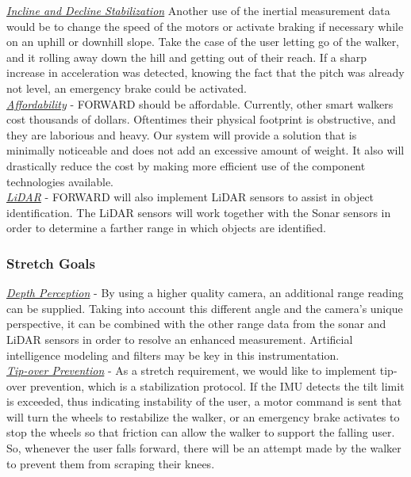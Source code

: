 \noindent \underline{\textit{Incline and Decline Stabilization}}
Another use of the inertial measurement data would be to change the speed of the motors or activate braking if necessary while on an uphill or downhill slope. Take the case of the user letting go of the walker, and it rolling away down the hill and getting out of their reach. If a sharp increase in acceleration was detected, knowing the fact that the pitch was already not level, an emergency brake could be activated.\\

\noindent \underline{\textit{Affordability}} - FORWARD should be affordable. Currently, other smart walkers cost thousands of dollars. Oftentimes their physical footprint is obstructive, and they are laborious and heavy. Our system will provide a solution that is minimally noticeable and does not add an excessive amount of weight. It also will drastically reduce the cost by making more efficient use of the component technologies available. \\

\noindent \underline{\textit{LiDAR}} - FORWARD will also implement LiDAR sensors to assist in object identification. The LiDAR sensors will work together with the Sonar sensors in order to determine a farther range in which objects are identified.  \\

\subsubsection{Stretch Goals}
\noindent \underline{\textit{Depth Perception}} - By using a higher quality camera, an additional range reading can be supplied. Taking into account this different angle and the camera’s unique perspective, it can be combined with the other range data from the sonar and LiDAR sensors in order to resolve an enhanced measurement. Artificial intelligence modeling and filters may be key in this instrumentation. \\

\noindent \underline{\textit{Tip-over Prevention}} - As a stretch requirement, we would like to implement tip-over prevention, which is a stabilization protocol. If the IMU detects the tilt limit is exceeded, thus indicating instability of the user, a motor command is sent that will turn the wheels to restabilize the walker, or an emergency brake activates to stop the wheels so that friction can allow the walker to support the falling user. So, whenever the user falls forward, there will be an attempt made by the walker to prevent them from scraping their knees. \\


